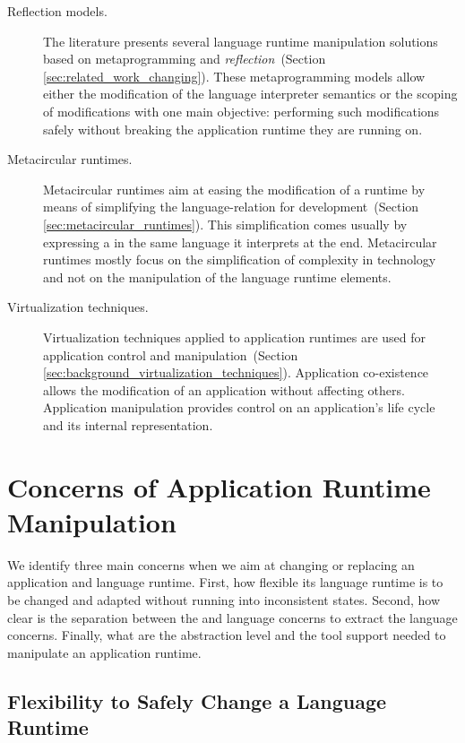 \begin{description}

\item[Reflection models.] The literature presents several language runtime manipulation solutions based on metaprogramming and \emph{reflection}~(Section \ref{sec:related_work_changing}). These metaprogramming models allow either the modification of the language interpreter semantics or the scoping of modifications with one main objective: performing such modifications safely \ie without breaking the application runtime they are running on.

\item[Metacircular runtimes.] Metacircular runtimes aim at easing the modification of a runtime by means of simplifying the language-\VM relation for development~(Section \ref{sec:metacircular_runtimes}). This simplification comes usually by expressing a \VM in the same language it interprets at the end. Metacircular runtimes mostly focus on the simplification of complexity in \VM technology and not on the manipulation of the language runtime elements.

\item[Virtualization techniques.] Virtualization techniques applied to application runtimes are used for application control and manipulation~(Section \ref{sec:background_virtualization_techniques}). Application co-existence allows the modification of an application without affecting others. Application manipulation provides control on an application's life cycle and its internal representation.

\end{description}

\section{Concerns of Application Runtime Manipulation} \label{sec:bootstrapping_problems}

We identify three main concerns when we aim at changing or replacing an application and language runtime. First, how flexible its language runtime is to be changed and adapted without running into inconsistent states. Second, how clear is the separation between the \VM and language concerns to extract the language concerns. Finally, what are the abstraction level and the tool support needed to manipulate an application runtime.


\subsection*{Flexibility to Safely Change a Language Runtime}

